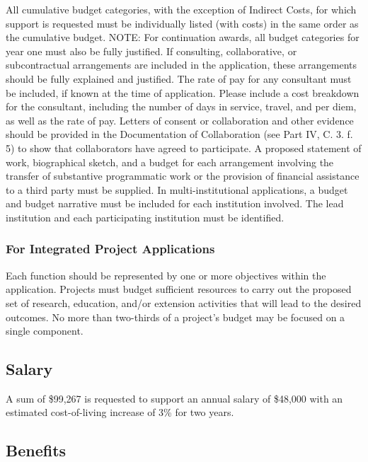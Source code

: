\documentclass[12pt,letterpaper]{article}
\title{\ruleline{Budget Justification}}
\begin{document}
\maketitle

All cumulative budget categories, with the exception of Indirect Costs, for
which support is requested must be individually listed (with costs) in the same
order as the cumulative budget. NOTE: For continuation awards, all budget
categories for year one must also be fully justified. If consulting,
collaborative, or subcontractual arrangements are included in the application,
these arrangements should be fully explained and justified. The rate of pay for
any consultant must be included, if known at the time of application. Please
include a cost breakdown for the consultant, including the number of days in
service, travel, and per diem, as well as the rate of pay. Letters of consent or
collaboration and other evidence should be provided in the Documentation of
Collaboration (see Part IV, C. 3. f. 5) to show that collaborators have agreed
to participate. A proposed statement of work, biographical sketch, and a budget
for each arrangement involving the transfer of substantive programmatic work or
the provision of financial assistance to a third party must be supplied. In
multi-institutional applications, a budget and budget narrative must be included
for each institution involved. The lead institution and each participating
institution must be identified.

\subsubsection{For Integrated Project Applications} 

Each function should be represented by one or more objectives within the
application. Projects must budget sufficient resources to carry out the proposed
set of research, education, and/or extension activities that will lead to the
desired outcomes. No more than two-thirds of a project's budget may be focused
on a single component.


\subsection{Salary}

A sum of \$99,267 is requested to support an annual salary of \$48,000 with an estimated cost-of-living increase of 3\% for two years.

\subsection{Benefits}
\end{document}
